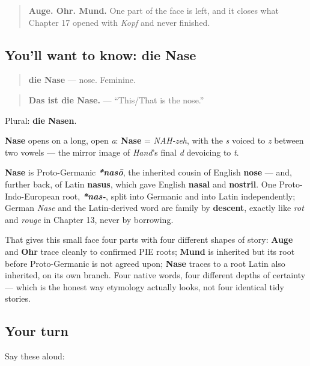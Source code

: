 \label{lesson:GE-C30-nase}



\begin{quote}
\textbf{Auge. Ohr. Mund.} One part of the face is left, and it closes what Chapter 17 opened with \emph{Kopf} and never finished.
\end{quote}

\subsection*{You'll want to know: die Nase}
\begin{quote}
\textbf{die Nase} — nose. Feminine.
\end{quote}

\begin{quote}
\textbf{Das ist die Nase.} — \textquotedblleft{}This/That is the nose.\textquotedblright{}
\end{quote}

Plural: \textbf{die Nasen}.

\begin{sounds}
\textbf{Nase} opens on a long, open \emph{a}: \textbf{Nase} = \emph{NAH-zeh}, with the \emph{s} voiced to \emph{z} between two vowels — the mirror image of \emph{Hand}'s final \emph{d} devoicing to \emph{t}.
\end{sounds}

\begin{cousinweb}
\textbf{Nase} is Proto-Germanic \emph{\textbf{*nasō}}, the inherited cousin of English \textbf{nose} — and, further back, of Latin \textbf{nasus}, which gave English \textbf{nasal} and \textbf{nostril}. One Proto-Indo-European root, \emph{\textbf{*nas-}}, split into Germanic and into Latin independently; German \emph{Nase} and the Latin-derived word are family by \textbf{descent}, exactly like \emph{rot} and \emph{rouge} in Chapter 13, never by borrowing.

That gives this small face four parts with four different shapes of story: \textbf{Auge} and \textbf{Ohr} trace cleanly to confirmed PIE roots; \textbf{Mund} is inherited but its root before Proto-Germanic is not agreed upon; \textbf{Nase} traces to a root Latin also inherited, on its own branch. Four native words, four different depths of certainty — which is the honest way etymology actually looks, not four identical tidy stories.
\end{cousinweb}

\subsection*{Your turn}
Say these aloud:

